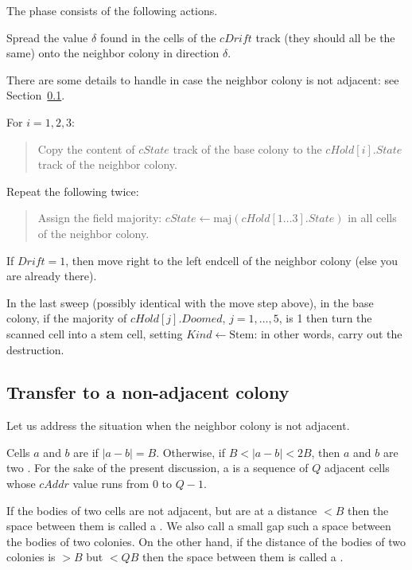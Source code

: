 \documentclass[12pt]{memoir}
\newcommand{\fld}[1]{\ensuremath{\textit{#1}}}
\newcommand{\maj}{\mathrm{maj}}
\def\B{B}
\newcommand{\cAddr}{\fld{cAddr}}
\newcommand{\Drift}{\fld{Drift}}
\newcommand{\Doomed}{\fld{Doomed}}
\newcommand{\cDrift}{\fld{cDrift}}
\newcommand{\cHold}{\fld{cHold}}
\newcommand{\Kind}{\fld{Kind}}
\newcommand{\State}{\fld{State}}
\newcommand{\cState}{\fld{cState}}
\newcommand{\Stem}{\mathrm{Stem}}
\begin{document}
The phase consists of the following actions.
\begin{enumerate}[1.]
\item
  Spread the value \( \delta \) found in the cells of the \( \cDrift \) track
  (they should all be the same)
  onto the neighbor colony in direction \( \delta \).

There are some details to handle in case the neighbor colony is not adjacent:
see Section~\ref{sec:adjacency}.

\item\label{i:transfer-state} For \( i=1,2,3 \):
        \begin{quote}
          Copy the content of \( \cState \) track of the base colony
            to the \( \cHold[i].\State \) track of the neighbor colony.
        \end{quote}

\item Repeat the following twice:
  \begin{quote}
 Assign the field majority: \( \cState\gets \maj(\cHold[1 \dots  3].\State) \)
in all cells of the neighbor colony.    
  \end{quote}
  
\item If \( \Drift = 1 \), then move right to the left endcell of the neighbor colony
(else you are already there).

        \begin{sloppypar}
          \item In the last sweep (possibly identical with the move step above), in the base colony,
            if the majority of \( \cHold[j].\Doomed \), \( j=1,\dots,5 \), is 1 then
            turn the scanned cell into a stem cell, setting \( \Kind\gets\Stem \): in other
            words, carry out the destruction.            
          \end{sloppypar}


\end{enumerate}

\subsection{Transfer to a non-adjacent colony}\label{sec:adjacency}

Let us address the situation when the neighbor colony is not adjacent.

\begin{definition}\label{def:adjacent}
  Cells \( a \) and \( b \) are  if \( |a-b|=\B \).
  Otherwise, if \( \B < | a- b| < 2\B \), then
  \( a \) and \( b \) are two .
For the sake of the present discussion, a  is a sequence of \( Q \) adjacent
cells whose \( \cAddr \) value runs from \( 0 \) to \( Q-1 \).

If the bodies of two cells are not adjacent, but are at a distance \( <\B \) then the space
between them is called a .
We also call a small gap such a space between the bodies of two colonies.
On the other hand, if the distance of the bodies of two colonies is \( >\B \) 
but \( <Q\B \) then the space between them is called a .
\end{definition}
\end{document}
